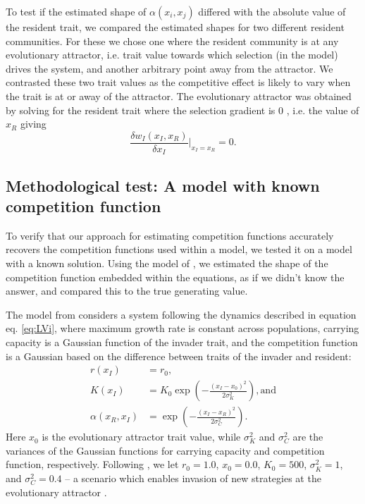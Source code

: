 \documentclass[a4paper,11pt]{article}
\begin{document}
To test if the estimated shape of $\alpha(x_i, x_j)$ differed with the absolute value of the resident trait, we compared the estimated shapes for two different resident communities. For these we chose one where the resident community is at any evolutionary attractor, i.e. trait value towards which selection (in the model) drives the system, and another arbitrary point away from the attractor. We contrasted these two trait values as the competitive effect is likely to vary when the trait is at or away of the attractor. The evolutionary attractor was obtained by solving for the resident trait where the selection gradient is 0 \citep{Geritz-1998}, i.e. the value of $x_R$ giving
\begin{equation} \label{eq:equil}\frac{\delta w_I(x_I, x_R)}{\delta x_I} |_{x_I = x_R} =0.
\end{equation}

\subsection{Methodological test: A model with known competition function}

To verify that our approach for estimating competition functions accurately recovers the competition functions used within a model, we tested it on a model with a known solution. Using the model of \citet{Dieckmann-1999}, we estimated the shape of the competition function embedded within the equations, as if we didn't know the answer, and compared this to the true generating value.

The model from \citet{Dieckmann-1999} considers a system following the dynamics described in equation eq. \ref{eq:LVi}, where maximum growth rate is constant across populations, carrying capacity is a Gaussian function of the invader trait, and the competition function is a Gaussian based on the difference between traits of the invader and resident:
\begin{subequations}
\begin{align}
\label{eq:DD}
r(x_I) &= r_0, \\
K(x_I) &= K_0 \exp\left(-\frac{\left(x_I-x_0\right)^2}{2\sigma^2_K}\right), \textrm{and}\\
\alpha(x_R, x_I) &= \exp\left(-\frac{\left(x_I-x_R\right)^2}{2\sigma^2_C}\right).
\end{align}
\end{subequations}
Here $x_0$ is the evolutionary attractor trait value, while $\sigma^2_K$ and $\sigma^2_C$ are the variances of the Gaussian functions for carrying capacity and competition function, respectively. Following \citet{Dieckmann-1999}, we let $r_0=1.0$, $x_0=0.0$, $K_0=500$, $\sigma^2_K=1$, and $\sigma^2_C=0.4$ -- a scenario which enables invasion of new strategies at the evolutionary attractor \citep{Dieckmann-1999}.
\end{document}
